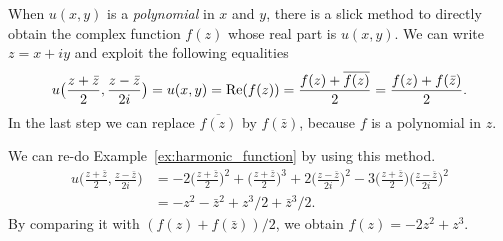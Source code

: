 %	
%
%
When $u(x,y)$ is a {\em polynomial} in $x$ and $y$, there is a slick method to directly obtain the complex function $f(z)$ whose real part is $u(x,y)$. 
We can write $z=x+iy$ and exploit the following equalities 
$$
u\big(\frac{z+\bar{z}}{2}, \frac{z-\bar{z}}{2i}\big) = u(x,y) = \operatorname{\mathrm{Re}}(f(z)) = \frac{f(z) + \overline{f(z)}}{2} = \frac{f(z) + f(\bar{z})}{2}.
$$
In the last step we can replace $\overline{f(z)}$ by $f(\bar{z})$, because $f$ is a polynomial in $z$.

We can re-do Example~\ref{ex:harmonic_function} by using this method.
\begin{align*}
	u\big(\frac{z+\bar{z}}{2}, \frac{z-\bar{z}}{2i}\big) &=
	-2 \big( \frac{z+\bar{z}}{2} \big)^2 + \big( \frac{z+\bar{z}}{2} \big)^3 +2 \big( \frac{z-\bar{z}}{2i} \big)^2 - 3 \big( \frac{z+\bar{z}}{2} \big) \big( \frac{z-\bar{z}}{2i} \big)^2 \\
	&= -z^2 - \bar{z}^2 + z^3/2 + \bar{z}^3/2.
\end{align*}
By comparing it with $(f(z)+f(\bar{z}))/2$, we obtain $f(z) = -2z^2 + z^3$.

